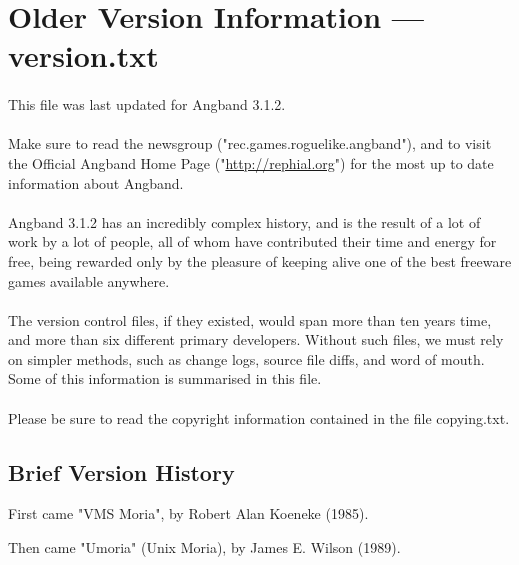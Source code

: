 \section{Older Version Information --- version.txt}

\paragraph{}This file was last updated for Angband 3.1.2.

\paragraph{}Make sure to read the newsgroup ("rec.games.roguelike.angband"), and to visit
the Official Angband Home Page ("\url{http://rephial.org}") for the most
up to date information about Angband.

\paragraph{}Angband 3.1.2 has an incredibly complex history, and is the result of a
lot of work by a lot of people, all of whom have contributed their time
and energy for free, being rewarded only by the pleasure of keeping alive
one of the best freeware games available anywhere.

\paragraph{}The version control files, if they existed, would span more than ten years
time, and more than six different primary developers.  Without such files,
we must rely on simpler methods, such as change logs, source file diffs, and
word of mouth.  Some of this information is summarised in this file.

\paragraph{}Please be sure to read the copyright information contained in the file
copying.txt.

\subsection{Brief Version History}

First came "VMS Moria", by Robert Alan Koeneke (1985).

Then came "Umoria" (Unix Moria), by James E. Wilson (1989).

